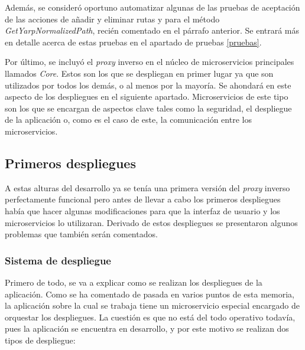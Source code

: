 \documentclass[11pt,spanish,listoffigures]{tfgetsinf}
\begin{document}
Además, se consideró oportuno automatizar algunas de las pruebas de aceptación de las acciones de añadir y eliminar rutas y para el método \emph{GetYarpNormalizedPath}, recién comentado en el párrafo anterior. Se entrará más en detalle acerca de estas pruebas en el apartado de pruebas \ref{pruebas}.

Por último, se incluyó el \emph{proxy} inverso en el núcleo de microservicios principales llamados \emph{Core}. Estos son los que se despliegan en primer lugar ya que son utilizados por todos los demás, o al menos por la mayoría. Se ahondará en este aspecto de los despliegues en el siguiente apartado. Microservicios de este tipo son los que se encargan de aspectos clave tales como la seguridad, el despliegue de la aplicación o, como es el caso de este, la comunicación entre los microservicios.


		\subsection{Primeros despliegues}

A estas alturas del desarrollo ya se tenía una primera versión del \emph{proxy} inverso perfectamente funcional pero antes de llevar a cabo los primeros despliegues había que hacer algunas modificaciones para que la interfaz de usuario y los microservicios lo utilizaran. Derivado de estos despliegues se presentaron algunos problemas que también serán comentados.


			\subsubsection{Sistema de despliegue}

Primero de todo, se va a explicar como se realizan los despliegues de la aplicación. Como se ha comentado de pasada en varios puntos de esta memoria, la aplicación sobre la cual se trabaja tiene un microservicio especial encargado de orquestar los despliegues. La cuestión es que no está del todo operativo todavía, pues la aplicación se encuentra en desarrollo, y por este motivo se realizan dos tipos de despliegue:
\end{document}
